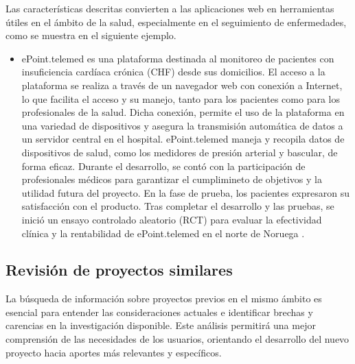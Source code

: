 Las características descritas convierten a las aplicaciones web en herramientas útiles en el ámbito de la salud, especialmente en el seguimiento de enfermedades, como se muestra en el siguiente ejemplo.

\begin{itemize}
    \item ePoint.telemed es una plataforma destinada al monitoreo de pacientes con insuficiencia cardíaca crónica (CHF) desde sus domicilios. El acceso a la plataforma se realiza a través de un navegador web con conexión a Internet, lo que facilita el acceso y su manejo, tanto para los pacientes como para los profesionales de la salud. Dicha conexión, permite el uso de la plataforma en una variedad de dispositivos y asegura la transmisión automática de datos a un servidor central en el hospital. ePoint.telemed maneja y recopila datos de dispositivos de salud, como los medidores de presión arterial y bascular, de forma eficaz. Durante el desarrollo, se contó con la participación de profesionales médicos para garantizar el cumplimineto de objetivos y la utilidad futura del proyecto. En la fase de prueba, los pacientes expresaron su satisfacción con el producto. Tras completar el desarrollo y las pruebas, se inició un ensayo controlado aleatorio (RCT) para evaluar la efectividad clínica y la rentabilidad de ePoint.telemed en el norte de Noruega \cite{ePoint}.
\end{itemize}


\subsection{Revisión de proyectos similares}
La búsqueda de información sobre proyectos previos en el mismo ámbito es esencial para entender las consideraciones actuales e identificar brechas y carencias en la investigación disponible. Este análisis permitirá una mejor comprensión de las necesidades de los usuarios, orientando el desarrollo del nuevo proyecto hacia aportes más relevantes y específicos. 

